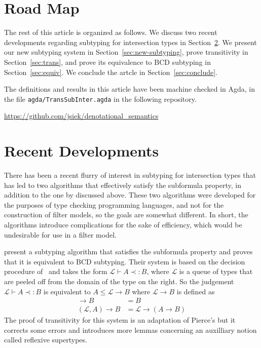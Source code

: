 \documentclass{article}
\begin{document}
\section{Road Map}
\label{sec:road-map}

The rest of this article is organized as follows. We discuss two
recent developments regarding subtyping for intersection types in
Section~\ref{sec:recent-developments}.  We present our new subtyping
system in Section~\ref{sec:new-subtyping}, prove transitivity in
Section~\ref{sec:trans}, and prove its equivalence to BCD subtyping in
Section~\ref{sec:equiv}. We conclude the artcle in
Section~\ref{sec:conclude}.

The definitions and results in this article have been machine checked
in Agda, in the file \texttt{agda/TransSubInter.agda} in the following
repository.

\begin{center}
  \url{https://github.com/jsiek/denotational_semantics}
\end{center}

\section{Recent Developments}
\label{sec:recent-developments}

There has been a recent flurry of interest in subtyping for
intersection types that has led to two algorithms that effectively
satisfy the subformula property, in addition to the one by
\citet{Laurent:2018aa} discussed above. These two algorithms were
developed for the purposes of type checking programming languages, and
not for the construction of filter models, so the goals are somewhat
different. In short, the algorithms introduce complications for the
sake of efficiency, which would be undesirable for use in a filter
model.

\citet{Bi:2018aa} present a subtyping algorithm that satisfies the
subformula property and proves that it is equivalent to BCD
subtyping. Their system is based on the decision procedure
of~\citet{Pierce:1989aa} and takes the form $\mathcal{L} \vdash A
\prec: B$, where $\mathcal{L}$ is a queue of types that are peeled off
from the domain of the type on the right. So the judgement
$\mathcal{L} \vdash A \prec: B$ is equivalent to $A \leq \mathcal{L}
\to B$ where $\mathcal{L} \to B$ is defined as
\begin{align*}
  [] \to B &= B\\
  (\mathcal{L},A) \to B &= \mathcal{L} \to (A \to B)
\end{align*}
The proof of transitivity for this system is an adaptation of Pierce's
but it corrects some errors and introduces more lemmas concerning an
auxilliary notion called reflexive supertypes.
\end{document}
